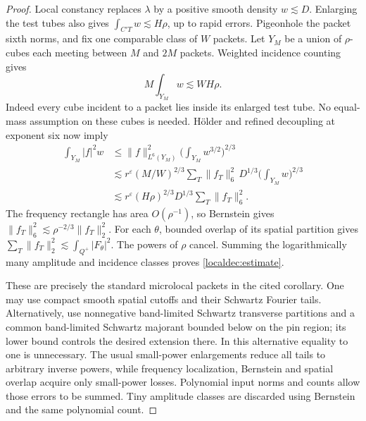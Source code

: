 \begin{proof}
Local constancy replaces \(\lambda\) by a positive smooth density
\(w\lesssim D\). Enlarging the test tubes also gives
\(\int_{C'T}w\lesssim H\rho\), up to rapid errors. Pigeonhole the
packet sixth norms, and fix one comparable class of \(W\) packets.
Let \(Y_M\) be a union of \(\rho\)-cubes each meeting between \(M\)
and \(2M\) packets. Weighted incidence counting gives
\[
 M\int_{Y_M}w\lesssim WH\rho.
\]
Indeed every cube incident to a packet lies inside its enlarged test
tube. No equal-mass assumption on these cubes is needed. H\"older and
refined decoupling at exponent six now imply
\begin{align*}
 \int_{Y_M}|f|^2w
 &\le \|f\|_{L^6(Y_M)}^2
          \Big(\int_{Y_M}w^{3/2}\Big)^{2/3}\\
 &\lesssim r^\varepsilon(M/W)^{2/3}
       \sum_T\|f_T\|_6^2\,
       D^{1/3}\Big(\int_{Y_M}w\Big)^{2/3}\\
 &\lesssim r^\varepsilon(H\rho)^{2/3}D^{1/3}
       \sum_T\|f_T\|_6^2.
\end{align*}
The frequency rectangle has area \(O(\rho^{-1})\), so Bernstein gives
\(\|f_T\|_6^2\lesssim\rho^{-2/3}\|f_T\|_2^2\).
For each \(\theta\), bounded overlap of its spatial partition gives
\(\sum_T\|f_T\|_2^2\lesssim\int_{Q^+}|F_\theta|^2\).
The powers of \(\rho\) cancel. Summing the logarithmically many
amplitude and incidence classes proves \eqref{localdec:estimate}.

These are precisely the standard microlocal packets in the cited
corollary. One may use compact smooth spatial cutoffs and their
Schwartz Fourier tails. Alternatively, use nonnegative band-limited
Schwartz transverse partitions and a common band-limited Schwartz
majorant bounded below on the pin region; its lower bound controls
the desired extension there. In this alternative equality to one is
unnecessary. The usual small-power enlargements reduce all tails to
arbitrary inverse powers, while frequency localization, Bernstein and
spatial overlap acquire only small-power losses. Polynomial input norms
and counts allow those errors to be summed. Tiny amplitude classes
are discarded using Bernstein and the same polynomial count.
\end{proof}

